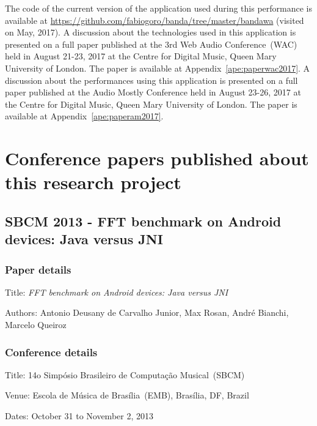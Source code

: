 The code of the current version of the application used during this performance is available at \url{https://github.com/fabiogoro/banda/tree/master/bandawa} (visited on May, 2017).
A discussion about the technologies used in this application is presented on a full paper published at the 3rd Web Audio Conference~(WAC) held in August 21-23, 2017 at the Centre for Digital Music, Queen Mary University of London.
The paper is available at Appendix~\ref{ape:paperwac2017}.
A discussion about the performances using this application is presented on a full paper published at the Audio Mostly Conference held in August 23-26, 2017 at the Centre for Digital Music, Queen Mary University of London.
The paper is available at Appendix~\ref{ape:paperam2017}.

\chapter{Conference papers published about this research project}
\label{ape:papers}

\section{SBCM 2013 - FFT benchmark on Android devices: Java versus JNI}
\label{ape:papersbcm2013}

\subsection*{Paper details}

Title: \textit{FFT benchmark on Android devices: Java versus JNI}

Authors: Antonio Deusany de Carvalho Junior, Max Rosan, André Bianchi, Marcelo Queiroz

\subsection*{Conference details}

Title: 14o Simpósio Brasileiro de Computação Musical~(SBCM)

Venue: Escola de Música de Brasília~(EMB), Brasília, DF, Brazil

Dates: October 31 to November 2, 2013



